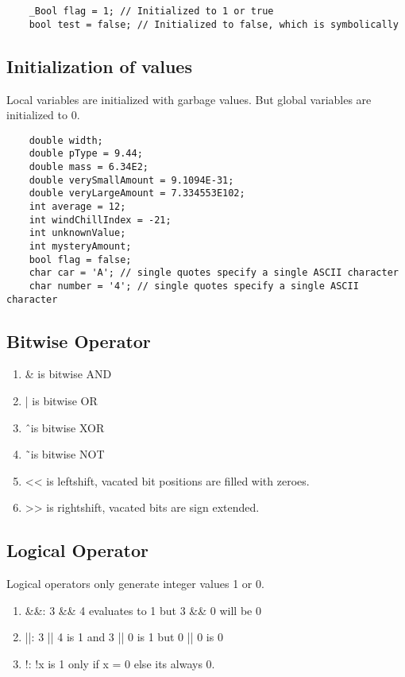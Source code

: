 \begin{verbatim}
    _Bool flag = 1; // Initialized to 1 or true
    bool test = false; // Initialized to false, which is symbolically
\end{verbatim}

\subsection{Initialization of values}
Local variables are initialized with garbage values. But global variables are initialized to 0.
\begin{verbatim}
    double width;
    double pType = 9.44;
    double mass = 6.34E2;
    double verySmallAmount = 9.1094E-31;
    double veryLargeAmount = 7.334553E102;
    int average = 12;
    int windChillIndex = -21;
    int unknownValue;
    int mysteryAmount;
    bool flag = false;
    char car = 'A'; // single quotes specify a single ASCII character
    char number = '4'; // single quotes specify a single ASCII character
\end{verbatim}

\subsection{Bitwise Operator}
\begin{enumerate}
    \item \& is bitwise AND
    \item | is bitwise OR
    \item \^\ is bitwise XOR
    \item \~\ is bitwise NOT
    \item << is leftshift, vacated bit positions are filled with zeroes.
    \item >> is rightshift, vacated bits are sign extended.
\end{enumerate}
\subsection{Logical Operator}
Logical operators only generate integer values 1 or 0.
\begin{enumerate}
    \item \&\&: 3 \&\& 4 evaluates to 1 but 3 \&\& 0 will be 0
    \item ||: 3 || 4 is 1 and 3 || 0 is 1 but 0 || 0 is 0
    \item !: !x is 1 only if x = 0 else its always 0.
\end{enumerate}

